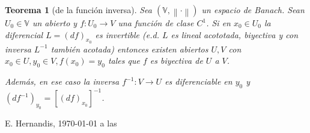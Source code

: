 \documentclass[a4paper,twocolumn]{extarticle}
\newcommand{\V}{\mathbb{V}}
\newcommand{\norma}[1]{\left\lVert#1\right\rVert}
\newtheorem*{thm}{Teorema}
\begin{document}
\begin{thm}[de la función inversa]
	Sea $(\V, \norma{\cdot})$ un espacio de Banach. Sean $U_0 \in \V$ un abierto y $f:U_0 \to V$ una función de clase $C^1$. Si en $x_0 \in U_0$ la diferencial $L = (df)_{x_0}$ es invertible (e.d. $L$ es lineal acototada, biyectiva y con inversa $L^{-1}$ también acotada) entonces existen abiertos $U, V$ con $x_0 \in U, y_0 \in V, f(x_0) = y_0$  tales que $f$ es biyectiva de $U$ a $V$.
	
	Además, en ese caso la inversa $f^{-1}:V \to U$ es diferenciable en $y_0$ y $(df^{-1})_{y_0} = [(df)_{x_0}]^{-1}$.
\end{thm}

\begin{flushright}
	E. Hernandis, \today $ $ a las \currenttime
\end{flushright}
\end{document}
